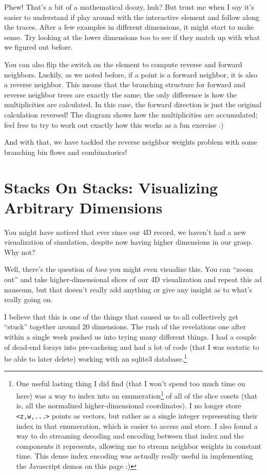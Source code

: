 \documentclass[]{article}
\renewcommand{\href}[2]{#2\footnote{\url{#1}}}
\begin{document}
Phew! That's a bit of a mathematical doozy, huh? But trust me when I say it's
easier to understand if play around with the interactive element and follow
along the traces. After a few examples in different dimensions, it might start
to make sense. Try looking at the lower dimensions too to see if they match up
with what we figured out before.

You can also flip the switch on the element to compute reverse and forward
neighbors. Luckily, as we noted before, if a point is a forward neighbor, it is
also a reverse neighbor. This means that the branching structure for forward and
reverse neighbor trees are exactly the same; the only difference is how the
multiplicities are calculated. In this case, the forward direction is just the
original calculation reversed! The diagram shows how the multiplicities are
accumulated; feel free to try to work out exactly how this works as a fun
exercise :)

And with that, we have tackled the reverse neighbor weights problem with some
branching bin flows and combinatorics!

\hypertarget{stacks-on-stacks-visualizing-arbitrary-dimensions}{%
\section{Stacks On Stacks: Visualizing Arbitrary
Dimensions}\label{stacks-on-stacks-visualizing-arbitrary-dimensions}}

You might have noticed that ever since our 4D record, we haven't had a new
visualization of simulation, despite now having higher dimensions in our grasp.
Why not?

Well, there's the question of \emph{how} you might even visualize this. You can
``zoom out'' and take higher-dimensional slices of our 4D visualization and
repeat this ad nauseum, but that doesn't really add anything or give any insight
as to what's really going on.

I believe that this is one of the things that caused us to all collectively get
``stuck'' together around 20 dimensions. The rush of the revelations one after
within a single week pushed us into trying many different things. I had a couple
of dead-end forays into pre-cacheing and had a lot of code (that I was ecstatic
to be able to later delete) working with an sqlite3 database.\footnote{One
  useful lasting thing I did find (that I won't spend too much time on here) was
  a way to
  \href{https://www.reddit.com/r/adventofcode/comments/kfb6zx/day_17_getting_to_t6_at_for_higher_spoilerss/gim68l0/}{index
  into an enumeration} of all of the slice cosets (that is, all the normalized
  higher-dimensional coordinates). I no longer store
  \texttt{\textless{}z,w,...\textgreater{}} points as vectors, but rather as a
  single integer representing their index in that enumeration, which is easier
  to access and store. I also found a way to do streaming decoding and encoding
  between that index and the components it represents, allowing me to stream
  neighbor weights in constant time. This dense index encoding was actually
  really useful in implementing the Javascript demos on this page :)}
\end{document}
